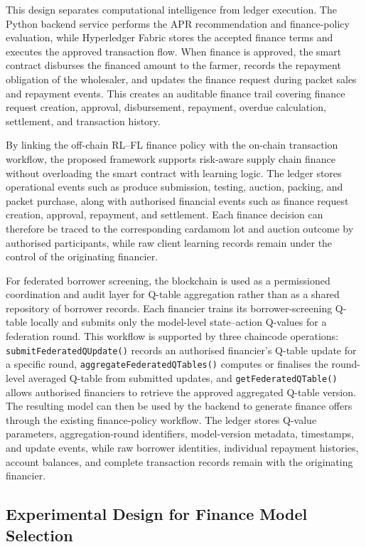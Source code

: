 \documentclass[12pt]{article}
\begin{document}
This design separates computational intelligence from ledger execution. The Python backend service performs the APR recommendation and finance-policy evaluation, while Hyperledger Fabric stores the accepted finance terms and executes the approved transaction flow. When finance is approved, the smart contract disburses the financed amount to the farmer, records the repayment obligation of the wholesaler, and updates the finance request during packet sales and repayment events. This creates an auditable finance trail covering finance request creation, approval, disbursement, repayment, overdue calculation, settlement, and transaction history.

By linking the off-chain RL--FL finance policy with the on-chain transaction workflow, the proposed framework supports risk-aware supply chain finance without overloading the smart contract with learning logic. The ledger stores operational events such as produce submission, testing, auction, packing, and packet purchase, along with authorised financial events such as finance request creation, approval, repayment, and settlement. Each finance decision can therefore be traced to the corresponding cardamom lot and auction outcome by authorised participants, while raw client learning records remain under the control of the originating financier.

For federated borrower screening, the blockchain is used as a permissioned coordination and audit layer for Q-table aggregation rather than as a shared repository of borrower records. Each financier trains its borrower-screening Q-table locally and submits only the model-level state--action Q-values for a federation round. This workflow is supported by three chaincode operations: \texttt{submitFederatedQUpdate()} records an authorised financier's Q-table update for a specific round, \texttt{aggregateFederatedQTables()} computes or finalises the round-level averaged Q-table from submitted updates, and \texttt{getFederatedQTable()} allows authorised financiers to retrieve the approved aggregated Q-table version. The resulting model can then be used by the backend to generate finance offers through the existing finance-policy workflow. The ledger stores Q-value parameters, aggregation-round identifiers, model-version metadata, timestamps, and update events, while raw borrower identities, individual repayment histories, account balances, and complete transaction records remain with the originating financier.
	
	\subsection{Experimental Design for Finance Model Selection}
	
\end{document}
